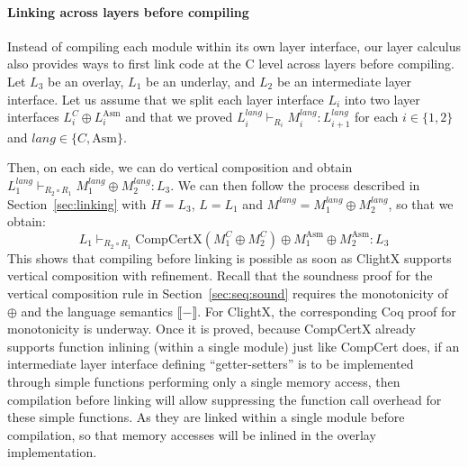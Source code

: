 \paragraph{Linking across layers before compiling}

Instead of compiling each module within its own layer interface, our layer
calculus also provides ways to first link code at the C level across
layers before compiling. Let $L_3$ be an overlay, $L_1$ be an
underlay, and $L_2$ be an intermediate layer interface. Let us assume that we
split each layer interface $L_i$ into two layer interfaces $L_i^C \oplus
L_i^{\mathrm{Asm}}$ and that we proved $L_{i}^{\mathit{lang}} \vdash_{R_i}
M_i^{\mathit{lang}}: L_{i+1}^{\mathit{lang}}$ for each $i \in \{1,2
\}$ and $\mathit{lang} \in \{ C, \mathrm{Asm} \}$.

Then, on each side, we can do vertical composition and obtain
$L_1^{\mathit{lang}} \vdash_{R_2 \circ R_1} M_1^{\mathit{lang}} \oplus
M_2^{\mathit{lang}} : L_3$. We can then follow the process described
in Section~\ref{sec:linking} with $H = L_3$, $L = L_1$ and
$M^{\mathit{lang}} = M_1^{\mathit{lang}} \oplus M_2^{\mathit{lang}}$, so that we obtain:
\[
L_1 \vdash_{R_2 \circ R_1} \mathrm{CompCertX}(M_1^C \oplus M_2^C) \oplus M_1^{\mathrm{Asm}} \oplus M_2^{\mathrm{Asm}}: L_3
\]
This shows that compiling before linking is possible as soon as
ClightX supports vertical composition with refinement. 
Recall that the soundness proof for the vertical composition rule in Section~\ref{sec:seq:sound}
requires the monotonicity of $\oplus$ and the language semantics $\llbracket - \rrbracket$.
For ClightX,
the
corresponding Coq proof for monotonicity is underway. 
Once it is proved, because CompCertX already
supports function inlining (within a single module) just like CompCert
does, if an intermediate layer interface defining ``getter-setters'' is to be
implemented through simple functions performing only a single memory
access, then compilation before linking will allow suppressing the
function call overhead for these simple functions. 
As they are linked
within a single module before compilation, so that memory accesses
will be inlined in the overlay implementation.



